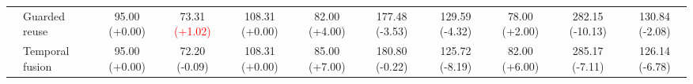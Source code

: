 \begin{table}[t]
{\begin{tabular}{clccccccccc}
& Guarded reuse
& 95.00 {\scriptsize\textcolor{green!50!black}{(+0.00)}} & 73.31 {\scriptsize\textcolor{red}{(+1.02)}} & 108.31 {\scriptsize\textcolor{green!50!black}{(+0.00)}}
& 82.00 {\scriptsize\textcolor{green!50!black}{(+4.00)}} & 177.48 {\scriptsize\textcolor{green!50!black}{(-3.53)}} & 129.59 {\scriptsize\textcolor{green!50!black}{(-4.32)}}
& 78.00 {\scriptsize\textcolor{green!50!black}{(+2.00)}} & 282.15 {\scriptsize\textcolor{green!50!black}{(-10.13)}} & 130.84 {\scriptsize\textcolor{green!50!black}{(-2.08)}} \\

& Temporal fusion
& 95.00 {\scriptsize\textcolor{green!50!black}{(+0.00)}} & 72.20 {\scriptsize\textcolor{green!50!black}{(-0.09)}} & 108.31 {\scriptsize\textcolor{green!50!black}{(+0.00)}}
& 85.00 {\scriptsize\textcolor{green!50!black}{(+7.00)}} & 180.80 {\scriptsize\textcolor{green!50!black}{(-0.22)}} & 125.72 {\scriptsize\textcolor{green!50!black}{(-8.19)}}
& 82.00 {\scriptsize\textcolor{green!50!black}{(+6.00)}} & 285.17 {\scriptsize\textcolor{green!50!black}{(-7.11)}} & 126.14 {\scriptsize\textcolor{green!50!black}{(-6.78)}} \\

\bottomrule
\end{tabular}
}
\end{table}
